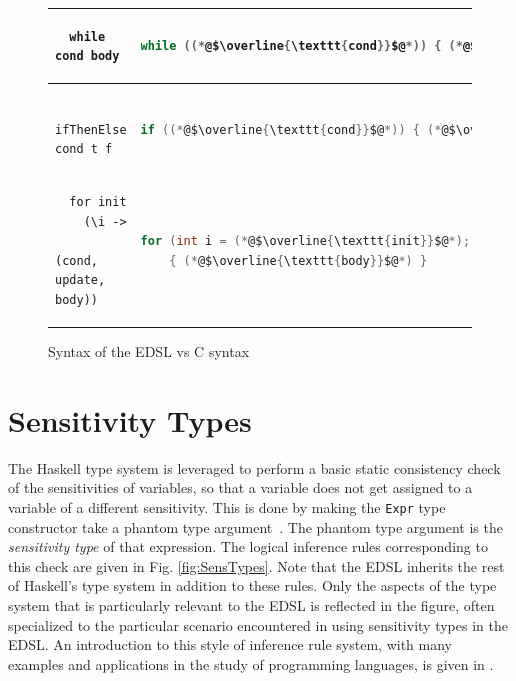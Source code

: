 \documentclass[10pt, conference]{IEEEtran}
\newcommand{\ttt}{\texttt}
\begin{document}
\begin{figure}
\begin{tabular}{|l|l|}
  \hline
  \begin{lstlisting}
  while cond body
  \end{lstlisting}
  & \begin{lstlisting}[language=C]
  while ((*@$\overline{\ttt{cond}}$@*)) { (*@$\overline{\ttt{body}}$@*) }
  \end{lstlisting}\\

  \hline
  \begin{lstlisting}
  ifThenElse cond t f
  \end{lstlisting}
  & \begin{lstlisting}[language=C]
  if ((*@$\overline{\ttt{cond}}$@*)) { (*@$\overline{\ttt{t}}$@*) } else { (*@$\overline{\ttt{f}}$@*) }
  \end{lstlisting}\\

  \hline
  \begin{lstlisting}
  for init
    (\i ->
      (cond, update, body))
  \end{lstlisting}
  & \begin{lstlisting}[language=C]
  for (int i = (*@$\overline{\ttt{init}}$@*); (*@$\overline{\ttt{cond}}$@*); (*@$\overline{\ttt{update}}$@*))
    { (*@$\overline{\ttt{body}}$@*) }
  \end{lstlisting}\\


  \hline
\end{tabular}
\caption{Syntax of the EDSL vs C syntax}
\label{fig:Syntax}
\end{figure}

\section{Sensitivity Types}
\label{sec:SensTypes}
The Haskell type system is leveraged to perform a basic static consistency check
of the sensitivities of variables, so that a variable does not get assigned to a
variable of a different sensitivity. This is done by making the \verb|Expr| type
constructor take a phantom type argument~\cite{Phantom}. The phantom type
argument is the \textit{sensitivity type} of that expression.  The logical
inference rules corresponding to this check are given in Fig.
\ref{fig:SensTypes}. Note that the EDSL inherits the rest of Haskell's type
system in addition to these rules. Only the aspects of the type system that is
particularly relevant to the EDSL is reflected in the figure, often specialized
to the particular scenario encountered in using sensitivity types in the EDSL.
An introduction to this style of inference rule system, with many examples and
applications in the study of programming languages, is given in
\cite{HarperFoundations}.
\end{document}
